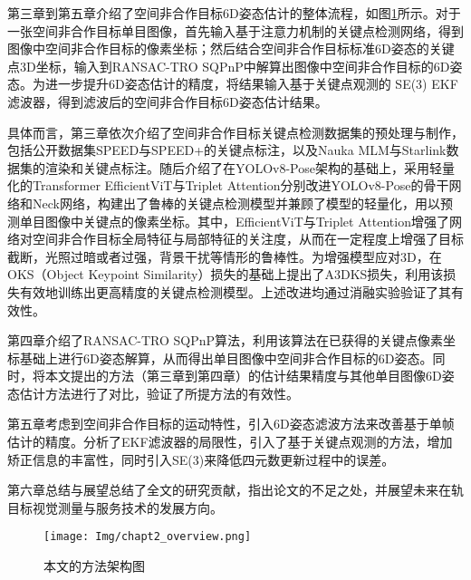 第三章到第五章介绍了空间非合作目标6D姿态估计的整体流程，如图\ref{fig:6D_pose_estimation_archieture}所示。对于一张空间非合作目标单目图像，首先输入基于注意力机制的关键点检测网络，得到图像中空间非合作目标的像素坐标；然后结合空间非合作目标标准6D姿态的关键点3D坐标，输入到RANSAC-TRO SQPnP中解算出图像中空间非合作目标的6D姿态。为进一步提升6D姿态估计的精度，将结果输入基于关键点观测的 SE(3) EKF滤波器，得到滤波后的空间非合作目标6D姿态估计结果。

具体而言，第三章依次介绍了空间非合作目标关键点检测数据集的预处理与制作，包括公开数据集SPEED与SPEED+的关键点标注，以及Nauka MLM与Starlink数据集的渲染和关键点标注。随后介绍了在YOLOv8-Pose架构的基础上，采用轻量化的Transformer EfficientViT与Triplet Attention分别改进YOLOv8-Pose的骨干网络和Neck网络，构建出了鲁棒的关键点检测模型并兼顾了模型的轻量化，用以预测单目图像中关键点的像素坐标。其中，EfficientViT与Triplet Attention增强了网络对空间非合作目标全局特征与局部特征的关注度，从而在一定程度上增强了目标截断，光照过暗或者过强，背景干扰等情形的鲁棒性。为增强模型应对3D，在OKS（Object Keypoint Similarity）损失的基础上提出了A3DKS损失，利用该损失有效地训练出更高精度的关键点检测模型。上述改进均通过消融实验验证了其有效性。

第四章介绍了RANSAC-TRO SQPnP算法，利用该算法在已获得的关键点像素坐标基础上进行6D姿态解算，从而得出单目图像中空间非合作目标的6D姿态。同时，将本文提出的方法（第三章到第四章）的估计结果精度与其他单目图像6D姿态估计方法进行了对比，验证了所提方法的有效性。

第五章考虑到空间非合作目标的运动特性，引入6D姿态滤波方法来改善基于单帧估计的精度。分析了EKF滤波器的局限性，引入了基于关键点观测的方法，增加矫正信息的丰富性，同时引入SE(3)来降低四元数更新过程中的误差。

第六章总结与展望总结了全文的研究贡献，指出论文的不足之处，并展望未来在轨目标视觉测量与服务技术的发展方向。

\begin{figure}[htbp]
	\centering
	\texttt{[image: Img/chapt2\_overview.png]}
	\caption{本文的方法架构图}
	\label{fig:6D_pose_estimation_archieture}
\end{figure}
